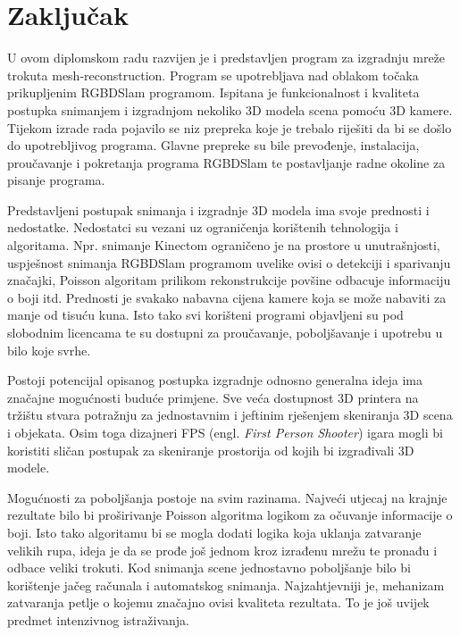 \newpage
\setcounter{figure}{0}

\section{Zaključak} %
\label{sec:Zaključak}

U ovom diplomskom radu razvijen je i predstavljen program za izgradnju
mreže trokuta mesh-reconstruction. Program se upotrebljava nad oblakom
točaka prikupljenim RGBDSlam programom. Ispitana je funkcionalnost i
kvaliteta postupka snimanjem i izgradnjom nekoliko 3D modela scena
pomoću 3D kamere. Tijekom izrade rada pojavilo se niz prepreka koje je
trebalo riješiti da bi se došlo do upotrebljivog programa. Glavne
prepreke su bile prevođenje, instalacija, proučavanje i pokretanja
programa RGBDSlam te postavljanje radne okoline za pisanje programa. 

Predstavljeni postupak snimanja i izgradnje 3D modela ima svoje
prednosti i nedostatke. Nedostatci su vezani uz ograničenja korištenih
tehnologija i algoritama. Npr. snimanje Kinectom ograničeno je na
prostore u unutrašnjosti, uspješnost snimanja RGBDSlam programom uvelike
ovisi o detekciji i sparivanju značajki, Poisson algoritam prilikom
rekonstrukcije povšine odbacuje informaciju o boji itd. Prednosti je
svakako nabavna cijena kamere koja se može nabaviti za manje od tisuću
kuna. Isto tako svi korišteni programi objavljeni su pod slobodnim
licencama te su dostupni za proučavanje, poboljšavanje i upotrebu u bilo
koje svrhe.  

Postoji potencijal opisanog postupka izgradnje odnosno generalna ideja
ima značajne mogućnosti buduće primjene. Sve veća dostupnost 3D printera 
na tržištu stvara potražnju za jednostavnim i jeftinim
rješenjem skeniranja 3D scena i objekata. Osim toga dizajneri FPS (engl.
\textit{First Person Shooter}) igara mogli bi koristiti sličan postupak
za skeniranje prostorija od kojih bi izgrađivali 3D modele.

Mogućnosti za poboljšanja postoje na svim razinama. Najveći utjecaj na
krajnje rezultate bilo bi proširivanje Poisson algoritma logikom za
očuvanje informacije o boji. Isto tako algoritamu bi se mogla dodati
logika koja uklanja zatvaranje velikih rupa, ideja je da se prođe još
jednom kroz izrađenu mrežu te pronađu i odbace veliki trokuti. Kod
snimanja scene jednostavno poboljšanje bilo bi korištenje jačeg računala
i automatskog snimanja. Najzahtjevniji je, mehanizam zatvaranja petlje o
kojemu značajno ovisi kvaliteta rezultata. To je još uvijek predmet
intenzivnog istraživanja. 

